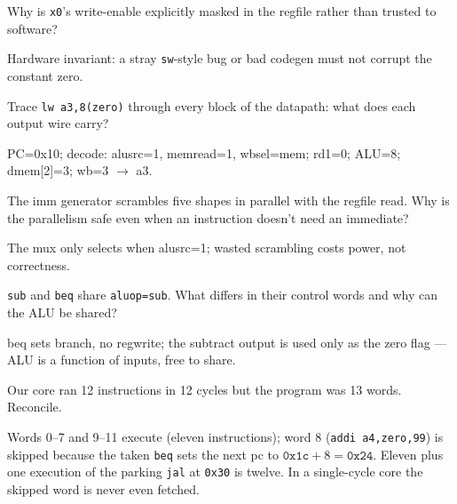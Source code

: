 \begin{exercise}[easy]\label{ex:e05b}
Why is \texttt{x0}'s write-enable explicitly masked in the regfile
rather than trusted to software?
\end{exercise}
\begin{solution}[hint]
Hardware invariant: a stray \texttt{sw}-style bug or bad codegen
must not corrupt the constant zero.
\end{solution}

\begin{exercise}[medium]\label{ex:m05a}
Trace \texttt{lw a3,8(zero)} through every block of the datapath:
what does each output wire carry?
\end{exercise}
\begin{solution}[hint]
PC=0x10; decode: alusrc=1, memread=1, wbsel=mem; rd1=0;
ALU=8; dmem[2]=3; wb=3 $\to$ a3.
\end{solution}

\begin{exercise}[medium]\label{ex:m05b}
The imm generator scrambles five shapes in parallel with the regfile
read. Why is the parallelism safe even when an instruction doesn't
need an immediate?
\end{exercise}
\begin{solution}[hint]
The mux only selects when alusrc=1; wasted scrambling costs power,
not correctness.
\end{solution}

\begin{exercise}[medium]\label{ex:m05c}
\texttt{sub} and \texttt{beq} share \texttt{aluop=sub}. What differs
in their control words and why can the ALU be shared?
\end{exercise}
\begin{solution}[hint]
beq sets branch, no regwrite; the subtract output is used only as
the zero flag --- ALU is a function of inputs, free to share.
\end{solution}

\begin{exercise}[medium]\label{ex:m05d}
Our core ran 12 instructions in 12 cycles but the program was 13
words. Reconcile.
\end{exercise}
\begin{solution}[hint]
Words 0--7 and 9--11 execute (eleven instructions); word 8
(\texttt{addi a4,zero,99}) is skipped because the taken \texttt{beq}
sets the next pc to $\texttt{0x1c}+8=\texttt{0x24}$. Eleven plus
one execution of the parking \texttt{jal} at \texttt{0x30} is twelve.
In a single-cycle core the skipped word is never even fetched.
\end{solution}

